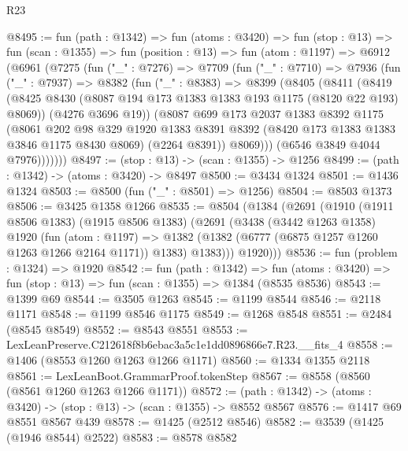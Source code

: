 \begin{lexlean}{R23}
\begin{coremodule}
@8495 := fun (path : @1342) =>
  fun (atoms : @3420) =>
  fun (stop : @13) =>
  fun (scan : @1355) =>
  fun (position : @13) =>
  fun (atom : @1197) =>
  @6912
    (@6961
      (@7275
        (fun ("_" : @7276) =>
        @7709
          (fun ("_" : @7710) =>
          @7936
            (fun ("_" : @7937) =>
            @8382
              (fun ("_" : @8383) =>
              @8399
                (@8405
                  (@8411
                    (@8419
                      (@8425 @8430 (@8087 @194 @173 @1383 @1383 @193 @1175 (@8120 @22 @193) @8069))
                      (@4276 @3696 @19))
                    (@8087
                      @699
                      @173
                      @2037
                      @1383
                      @8392
                      @1175
                      (@8061
                        @202
                        @98
                        @329
                        @1920
                        @1383
                        @8391
                        @8392
                        (@8420 @173 @1383 @1383 @3846 @1175 @8430 @8069)
                        (@2264 @8391))
                      @8069)))
                (@6546 @3849 @4044 @7976)))))))
@8497 := (stop : @13) -> (scan : @1355) -> @1256
@8499 := (path : @1342) -> (atoms : @3420) -> @8497
@8500 := @3434 @1324
@8501 := @1436 @1324
@8503 := @8500 (fun ("_" : @8501) => @1256)
@8504 := @8503 @1373
@8506 := @3425 @1358 @1266
@8535 := @8504
    (@1384
      (@2691
        (@1910
          (@1911 @8506 @1383)
          (@1915 @8506 @1383)
          (@2691
            (@3438
              (@3442 @1263 @1358)
              @1920
              (fun (atom : @1197) =>
              @1382 (@1382 (@6777 (@6875 @1257 @1260 @1263 @1266 @2164 @1171)) @1383) @1383)))
          @1920)))
@8536 := fun (problem : @1324) => @1920
@8542 := fun (path : @1342) =>
  fun (atoms : @3420) => fun (stop : @13) => fun (scan : @1355) => @1384 (@8535 @8536)
@8543 := @1399 @69
@8544 := @3505 @1263
@8545 := @1199 @8544
@8546 := @2118 @1171
@8548 := @1199 @8546 @1175
@8549 := @1268 @8548
@8551 := @2484 (@8545 @8549)
@8552 := @8543 @8551
@8553 := LexLeanPreserve.C212618f8b6ebac3a5c1e1dd0896866e7.R23.__fits_4
@8558 := @1406 (@8553 @1260 @1263 @1266 @1171)
@8560 := @1334 @1355 @2118
@8561 := LexLeanBoot.GrammarProof.tokenStep
@8567 := @8558 (@8560 (@8561 @1260 @1263 @1266 @1171))
@8572 := (path : @1342) -> (atoms : @3420) -> (stop : @13) -> (scan : @1355) -> @8552 @8567
@8576 := @1417 @69 @8551 @8567 @439
@8578 := @1425 (@2512 @8546)
@8582 := @3539 (@1425 (@1946 @8544) @2522)
@8583 := @8578 @8582

\end{coremodule}
\end{lexlean}
